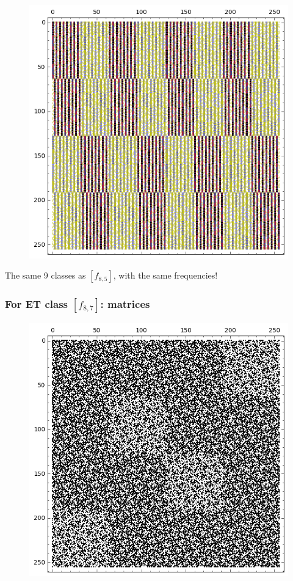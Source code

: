 \documentclass[pdf,sprung,slideColor,nocolorBG]{beamer}
\newenvironment{colortheme}[1]{
\def\ProvidesPackageRCS $##1${\relax}
\renewcommand{\ProcessOptions}{\relax}
\makeatletter

\makeatother
}{}
\begin{document}
\begin{colortheme}{jubata}
\begin{frame}
\begin{figure}
\begin{minipage}{.48\textwidth}
  \label{fig:8_6_weight_class_matrix}
\end{minipage}%
\begin{minipage}{.48\textwidth}
  \centering
  \includegraphics[width=.9\linewidth]{../matrix_plot/re8_6_bent_cayley_graph_index_matrix.png}
  \label{fig:8_6_bent_cayley_graph_index_matrix}
\end{minipage}
\end{figure}
The same 9 classes as $[f_{8,5}]$, with the same frequencies!
\end{frame}
\begin{frame}
\frametitle{For ET class $[f_{8,7}]$: matrices}
\begin{figure}
\centering
\begin{minipage}{.48\textwidth}
  \centering
  \includegraphics[width=.9\linewidth]{../matrix_plot/re8_7_weight_class_matrix.png}

\end{minipage}
\end{figure}
\end{frame}
\end{colortheme}
\end{document}
